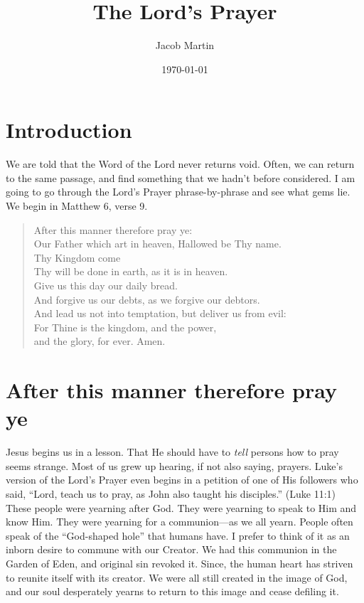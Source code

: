 \documentclass[12pt]{article}
\author{Jacob Martin}
\date{\today}
\title{The Lord's Prayer}
\begin{document}
\maketitle

\section{Introduction}

We are told that the Word of the Lord never returns void.  Often, we can return to the same passage, and find something that we hadn't before considered.  I am going to go through the Lord's Prayer phrase-by-phrase and see what gems lie.  We begin in Matthew 6, verse 9.
\begin{quote}
After this manner therefore pray ye: \\
Our Father which art in heaven, Hallowed be Thy name. \\
Thy Kingdom come \\
Thy will be done in earth, as it is in heaven. \\
Give us this day our daily bread. \\
And forgive us our debts, as we forgive our debtors. \\
And lead us not into temptation, but deliver us from evil: \\
For Thine is the kingdom, and the power, \\
and the glory, for ever. Amen.
\end{quote}

\section{After this manner therefore pray ye}
\label{sec-2}
Jesus begins us in a lesson.  That He should have to \emph{tell} persons how to pray seems strange.  Most of us grew up hearing, if not also saying, prayers.  Luke's version of the Lord's Prayer even begins in a petition of one of His followers who said, ``Lord, teach us to pray, as John also taught his disciples.''  (Luke 11:1) These people were yearning after God.  They were yearning to speak to Him and know Him.  They were yearning for a communion---as we all yearn.  People often speak of the ``God-shaped hole'' that humans have.  I prefer to think of it as an inborn desire to commune with our Creator.  We had this communion in the Garden of Eden, and original sin revoked it.  Since, the human heart has striven to reunite itself with its creator.  We were all still created in the image of God, and our soul desperately yearns to return to this image and cease defiling it.
\end{document}
